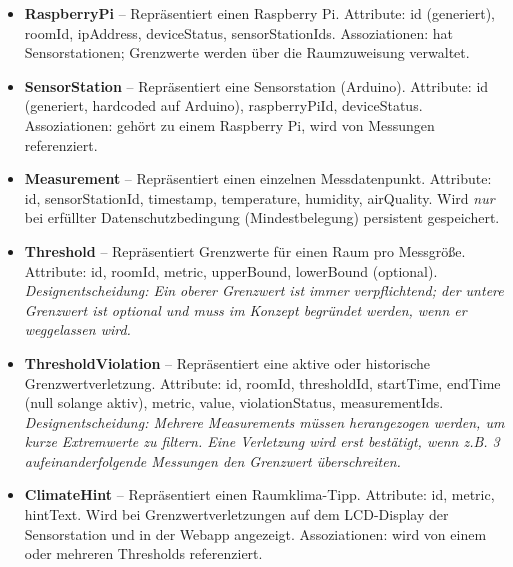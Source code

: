 \documentclass[12pt,a4paper]{article}
\begin{document}
\begin{itemize}
	\item \textbf{RaspberryPi} -- Repräsentiert einen Raspberry Pi. Attribute: id (generiert), roomId, ipAddress, deviceStatus, sensorStationIds. Assoziationen: hat Sensorstationen; Grenzwerte werden über die Raumzuweisung verwaltet.
	\item \textbf{SensorStation} -- Repräsentiert eine Sensorstation (Arduino). Attribute: id (generiert, hardcoded auf Arduino), raspberryPiId, deviceStatus. Assoziationen: gehört zu einem Raspberry Pi, wird von Messungen referenziert.
	\item \textbf{Measurement} -- Repräsentiert einen einzelnen Messdatenpunkt. Attribute: id, sensorStationId, timestamp, temperature, humidity, airQuality. Wird \emph{nur} bei erfüllter Datenschutzbedingung (Mindestbelegung) persistent gespeichert.
	\item \textbf{Threshold} -- Repräsentiert Grenzwerte für einen Raum pro Messgröße. Attribute: id, roomId, metric, upperBound, lowerBound (optional). \textit{Designentscheidung: Ein oberer Grenzwert ist immer verpflichtend; der untere Grenzwert ist optional und muss im Konzept begründet werden, wenn er weggelassen wird.}
	\item \textbf{ThresholdViolation} -- Repräsentiert eine aktive oder historische Grenzwertverletzung. Attribute: id, roomId, thresholdId, startTime, endTime (null solange aktiv), metric, value, violationStatus, measurementIds. \textit{Designentscheidung: Mehrere Measurements müssen herangezogen werden, um kurze Extremwerte zu filtern. Eine Verletzung wird erst bestätigt, wenn z.B. 3 aufeinanderfolgende Messungen den Grenzwert überschreiten.}
	\item \textbf{ClimateHint} -- Repräsentiert einen Raumklima-Tipp. Attribute: id, metric, hintText. Wird bei Grenzwertverletzungen auf dem LCD-Display der Sensorstation und in der Webapp angezeigt. Assoziationen: wird von einem oder mehreren Thresholds referenziert.
\end{itemize}
\end{document}
